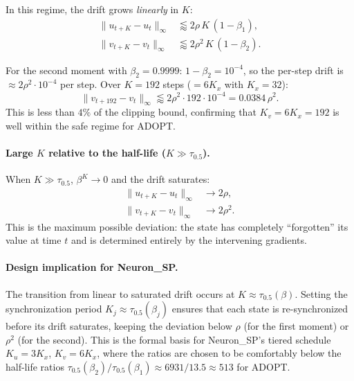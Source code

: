 \documentclass{article}
\begin{document}
In this regime, the drift grows \emph{linearly} in $K$:
\begin{align}
\|u_{t+K} - u_t\|_\infty &\lessapprox 2\rho\,K\,(1-\beta_1),
\label{eq:drift_u_linear} \\
\|v_{t+K} - v_t\|_\infty &\lessapprox 2\rho^2\,K\,(1-\beta_2).
\label{eq:drift_v_linear}
\end{align}

For the second moment with $\beta_2 = 0.9999$:
$1 - \beta_2 = 10^{-4}$, so the per-step drift is
$\approx 2\rho^2 \cdot 10^{-4}$ per step. Over $K = 192$ steps
($= 6K_x$ with $K_x = 32$):
\begin{equation}
\|v_{t+192} - v_t\|_\infty
\lessapprox 2\rho^2 \cdot 192 \cdot 10^{-4}
= 0.0384\,\rho^2.
\label{eq:drift_v_concrete}
\end{equation}
This is less than $4\%$ of the clipping bound, confirming that
$K_v = 6K_x = 192$ is well within the safe regime for ADOPT.

\paragraph{Large $K$ relative to the half-life ($K \gg \tau_{0.5}$).}

When $K \gg \tau_{0.5}$, $\beta^K \to 0$ and the drift saturates:
\begin{align}
\|u_{t+K} - u_t\|_\infty &\to 2\rho,
\label{eq:drift_u_saturate} \\
\|v_{t+K} - v_t\|_\infty &\to 2\rho^2.
\label{eq:drift_v_saturate}
\end{align}
This is the maximum possible deviation: the state has completely
``forgotten'' its value at time $t$ and is determined entirely by the
intervening gradients.

\paragraph{Design implication for Neuron\_SP.}
The transition from linear to saturated drift occurs at
$K \approx \tau_{0.5}(\beta)$. Setting the synchronization period
$K_j \approx \tau_{0.5}(\beta_j)$ ensures that each state is
re-synchronized before its drift saturates, keeping the deviation
below $\rho$ (for the first moment) or $\rho^2$ (for the second).
This is the formal basis for Neuron\_SP's tiered schedule
$K_u = 3K_x$, $K_v = 6K_x$, where the ratios are chosen to be
comfortably below the half-life ratios
$\tau_{0.5}(\beta_2)/\tau_{0.5}(\beta_1) \approx 6931/13.5 \approx 513$
for ADOPT.
\end{document}
